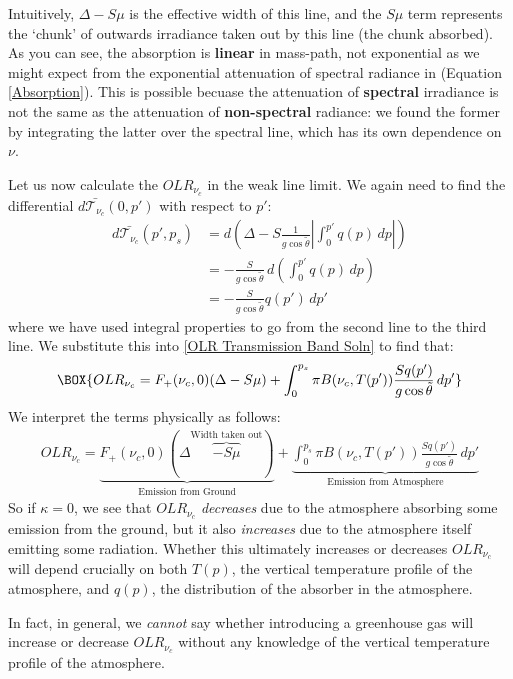 Intuitively, $\Delta-S\mu$ is the effective width of this line, and the $S\mu$ term represents the `chunk' of outwards irradiance taken out by this line (the chunk absorbed). As you can see, the absorption is \textbf{linear} in mass-path, not exponential as we might expect from the exponential attenuation of spectral radiance in (Equation \ref{Absorption}). This is possible becuase the attenuation of \textbf{spectral} irradiance is not the same as the attenuation of \textbf{non-spectral} radiance: we found the former by integrating the latter over the spectral line, which has its own dependence on $\nu$.

Let us now calculate the $OLR_{\nu_c}$ in the weak line limit. We again need to find the differential $d\bar{\mathcal{T}_{\nu_c}}(0,p')$ with respect to $p'$:
\begin{align*}
    d\bar{\mathcal{T}_{\nu_c}}(p',p_s)&=d\left( 
        \Delta - S\frac{1}{g\cos\tilde{\theta}}\left|
            \int_{0}^{p'}q(p)\,dp
        \right|
     \right)\\
     &= -\frac{S}{g\cos\tilde{\theta}}\,d\left( 
        \int_{0}^{p'}q(p)\,dp
      \right)
     \\
     &= -\frac{S}{g\cos\tilde{\theta}}q(p')\,dp'
\end{align*}
where we have used integral properties to go from the second line to the third line. We substitute this into \ref{OLR Transmission Band Soln} to find that: 
\begin{align}
    \label{Weak OLR}
    \BOX{OLR_{\nu_c}
    =F_+(\nu_c,0)(\Delta-S\mu)+\int_{0}^{p_s}\pi B(\nu_c,T(p'))\frac{Sq(p')}{g\cos\tilde{\theta}}\,dp'}
\end{align}
We interpret the terms physically as follows:
\begin{align*}
    OLR_{\nu_c}
    =\underbrace{F_+(\nu_c,0)(\Delta\overbrace{-S\mu}^{\text{Width taken out}})}_{\text{Emission from Ground}}
    +\underbrace{\int_{0}^{p_s}\pi B(\nu_c,T(p'))\frac{Sq(p')}{g\cos\tilde{\theta}}\,dp'}_{\text{Emission from Atmosphere}}
\end{align*}
So if $\kappa=0$, we see that $OLR_{\nu_c}$ \textit{decreases} due to the atmosphere absorbing some emission from the ground, but it also \textit{increases} due to the atmosphere itself emitting some radiation. Whether this ultimately increases or decreases $OLR_{\nu_c}$ will depend crucially on both $T(p)$, the vertical temperature profile of the atmosphere, and $q(p)$, the distribution of the absorber in the atmosphere.

In fact, in general, we \textit{cannot} say whether introducing a greenhouse gas will increase or decrease $OLR_{\nu_c}$ without any knowledge of the vertical temperature profile of the atmosphere.

